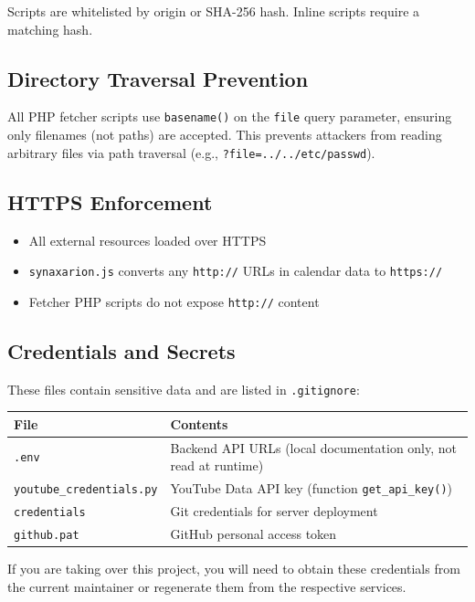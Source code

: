 \documentclass[12pt]{article}
\begin{document}
Scripts are whitelisted by origin or SHA-256 hash. Inline scripts require a matching hash.

\subsection{Directory Traversal Prevention}

All PHP fetcher scripts use \texttt{basename()} on the \texttt{file} query parameter, ensuring only filenames (not paths) are accepted. This prevents attackers from reading arbitrary files via path traversal (e.g., \texttt{?file=../../etc/passwd}).

\subsection{HTTPS Enforcement}

\begin{itemize}
    \item All external resources loaded over HTTPS
    \item \texttt{synaxarion.js} converts any \texttt{http://} URLs in calendar data to \texttt{https://}
    \item Fetcher PHP scripts do not expose \texttt{http://} content
\end{itemize}

\subsection{Credentials and Secrets}

These files contain sensitive data and are listed in \texttt{.gitignore}:

\begin{longtable}{p{5cm}p{8cm}}
\toprule
\textbf{File} & \textbf{Contents} \\
\midrule
\texttt{.env} & Backend API URLs (local documentation only, not read at runtime) \\
\texttt{youtube\_credentials.py} & YouTube Data API key (function \texttt{get\_api\_key()}) \\
\texttt{credentials} & Git credentials for server deployment \\
\texttt{github.pat} & GitHub personal access token \\
\bottomrule
\end{longtable}

If you are taking over this project, you will need to obtain these credentials from the current maintainer or regenerate them from the respective services.
\end{document}
